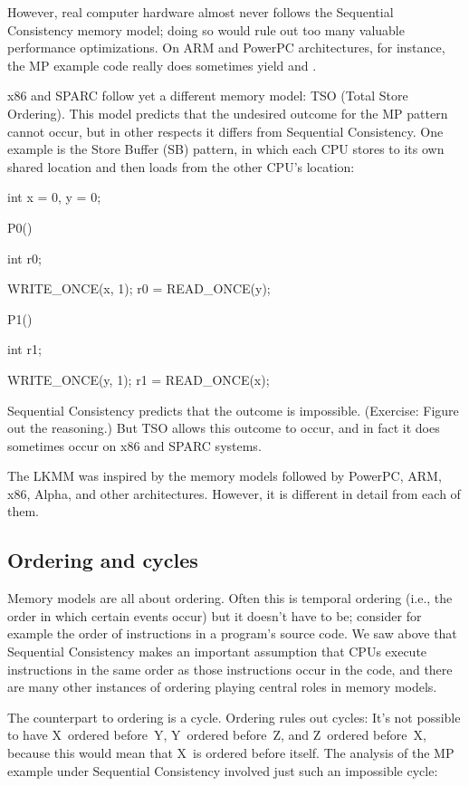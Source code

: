 However, real computer hardware almost never follows the Sequential
Consistency memory model; doing so would rule out too many valuable
performance optimizations.
On ARM and PowerPC architectures, for instance, the MP example code
really does sometimes yield  and .

x86 and SPARC follow yet a different memory model:
TSO (Total Store Ordering).
This model predicts that the undesired outcome for the MP pattern
cannot occur, but in other respects it differs from Sequential
Consistency.
One example is the Store Buffer (SB) pattern, in which each CPU
stores to its own shared location and then loads from the other CPU's
location:

\begin{VerbatimU}
	int x = 0, y = 0;

	P0()
	{
		int r0;

		WRITE_ONCE(x, 1);
		r0 = READ_ONCE(y);
	}

	P1()
	{
		int r1;

		WRITE_ONCE(y, 1);
		r1 = READ_ONCE(x);
	}
\end{VerbatimU}

Sequential Consistency predicts that the outcome  is
impossible.
(Exercise:
Figure out the reasoning.)
But TSO allows this outcome to occur, and in fact it does sometimes
occur on x86 and SPARC systems.

The LKMM was inspired by the memory models followed by PowerPC, ARM,
x86, Alpha, and other architectures.
However, it is different in detail from each of them.


\subsection{Ordering and cycles}
\label{sec:docs:explanation:Ordering and Cycles}

Memory models are all about ordering.
Often this is temporal ordering (i.e., the order in which certain
events occur) but it doesn't have to be; consider for example the
order of instructions in a program's source code.
We saw above that Sequential Consistency makes an important assumption
that CPUs execute instructions in the same order as those instructions
occur in the code, and there are many other instances of ordering
playing central roles in memory models.

The counterpart to ordering is a cycle.
Ordering rules out cycles:
It's not possible to have X~ordered before~Y, Y~ordered before~Z, and
Z~ordered before~X, because this would mean that X~is ordered before
itself.
The analysis of the MP example under Sequential Consistency involved
just such an impossible cycle:

